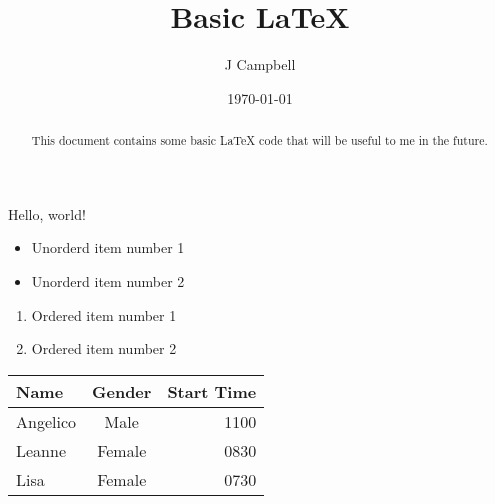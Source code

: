 \documentclass{article} %
\title{Basic LaTeX}
\author{J Campbell}
\date{\today}
\begin{document}
\maketitle
Hello, world!
\begin{abstract}
This document contains some basic LaTeX code that will be useful to me in the future.
\end{abstract}
\begin{itemize}
    \item Unorderd item number 1
    \item Unorderd item number 2
\end{itemize}

\begin{enumerate}
    \item Ordered item number 1
    \item Ordered item number 2
\end{enumerate}

\begin{tabular}{|l|c|r|}
    \hline
    Name & Gender & Start Time\\
    \hline
    Angelico & Male & 1100\\
    \hline
    Leanne & Female & 0830\\
    \hline
    Lisa & Female & 0730\\
    \hline
\end{tabular}
\end{document}
